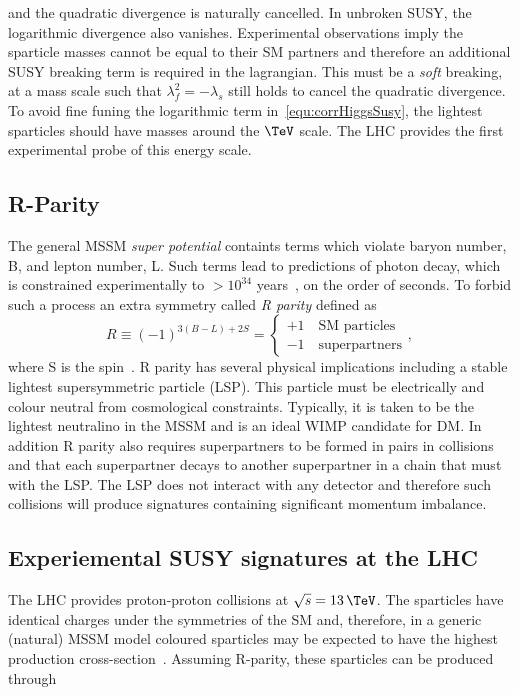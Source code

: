and the quadratic divergence is naturally cancelled. In unbroken SUSY, the logarithmic divergence also vanishes. 
Experimental observations imply the sparticle masses cannot be equal to their SM partners and
therefore an additional SUSY breaking term is required in the lagrangian. This must be a \emph{soft} breaking,
at a mass scale such that $\lambda_f^2 = -\lambda_s$ still holds to cancel the quadratic divergence.
To avoid fine funing the logarithmic term in~\ref{equ:corrHiggsSusy}, the lightest sparticles should have 
masses around the $\TeV$ scale. The LHC provides the first experimental probe of this energy scale.

\subsection{R-Parity}

The general MSSM \emph{super potential} containts terms which violate baryon number, B, and lepton number, 
L. Such terms lead to predictions of photon decay, which is constrained experimentally to $> 10^{34}$ years~\cite{protonDecay}, 
on the order of seconds. To forbid such a process an extra symmetry called \emph{R parity} defined as 
\begin{equation}
R \equiv (-1)^{3(B-L)+2S} = 
\begin{cases}
+ 1\quad \text{SM particles}\\
- 1\quad \text{superpartners}
\end{cases},
\end{equation}
where S is the spin~\cite{SUSYP}. R parity has several physical implications including a stable lightest supersymmetric 
particle (LSP). This particle must be electrically and colour neutral from cosmological constraints.
Typically, it is taken to be the lightest neutralino in the MSSM and is an ideal WIMP candidate for DM. 
In addition R parity also requires superpartners 
to be formed in pairs in collisions and that each superpartner decays to another superpartner
in a chain that must with the LSP. The LSP does not interact with any detector and therefore
such collisions will produce signatures containing significant momentum imbalance.

\subsection{Experiemental SUSY signatures at the LHC}

The LHC provides proton-proton collisions at $\sqrt{s} = 13\,\TeV$. The sparticles have identical charges under 
the symmetries of the SM and, therefore, in a generic (natural) MSSM model 
coloured sparticles may be expected to have the highest production 
cross-section~\cite{susyprod}. Assuming R-parity, these sparticles can be produced through

